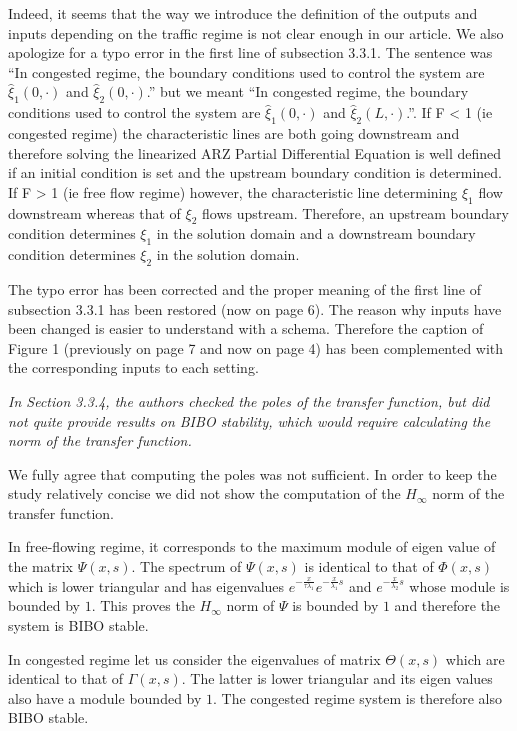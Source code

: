 \documentclass{article}
\begin{document}
Indeed, it seems that the way we introduce the definition of the outputs and inputs depending on the traffic regime is not clear enough in our article. We also apologize for a typo error in the first line of subsection 3.3.1. The sentence was ``In congested regime, the boundary conditions used to control the system are $\hat{\xi}_{1}\left(0,\cdot\right)$ and $\hat{\xi}_{2}\left(0,\cdot\right)$.'' but we meant ``In congested regime, the boundary conditions used to control the system are $\hat{\xi}_{1}\left(0,\cdot\right)$ and $\hat{\xi}_{2}\left(L,\cdot\right)$.''.
If F < 1 (ie congested regime) the characteristic lines are both going downstream and therefore solving the linearized ARZ Partial Differential Equation is well defined if an initial condition is set and the upstream boundary condition is determined.
If F > 1 (ie free flow regime) however, the characteristic line determining $\xi_1$ flow downstream whereas that of $\xi_2$ flows upstream. Therefore, an upstream boundary condition determines $\xi_1$ in the solution domain and a downstream boundary condition determines $\xi_2$ in the solution domain.

The typo error has been corrected and the proper meaning of the first line of subsection 3.3.1 has been restored (now on page 6). The reason why inputs have been changed is easier to understand with a schema. Therefore the caption of Figure 1 (previously on page 7 and now on page 4) has been complemented with the corresponding inputs to each setting.

\bigskip{}

\emph{
In Section 3.3.4, the authors checked the poles of the transfer function, but did not quite provide results on BIBO stability, which would require calculating the norm of the transfer function.
}

We fully agree that computing the poles was not sufficient. In order to keep the study relatively concise we did not show the computation of the $H_{\infty}$ norm of the transfer function. 

In free-flowing regime, it corresponds to the maximum module of eigen value of the matrix $\Psi(x,s)$. The spectrum of $\Psi(x,s)$ is identical to that of $\Phi(x,s)$ which is lower triangular and has eigenvalues 
$
e^{ - \frac{x}{\tau \lambda_1}}
e^{ - \frac{x}{\lambda_1} s}
$
and
$
e^{ - \frac{x}{\lambda_2} s}
$
whose module is bounded by $1$.
This proves the $H_{\infty}$ norm of $\Psi$ is bounded by $1$ and therefore the system is BIBO stable.

In congested regime let us consider the eigenvalues of matrix $\Theta(x,s)$ which are identical to that of $\Gamma(x,s)$.
The latter is lower triangular and its eigen values also have a module bounded by $1$.
The congested regime system is therefore also BIBO stable.
\end{document}
